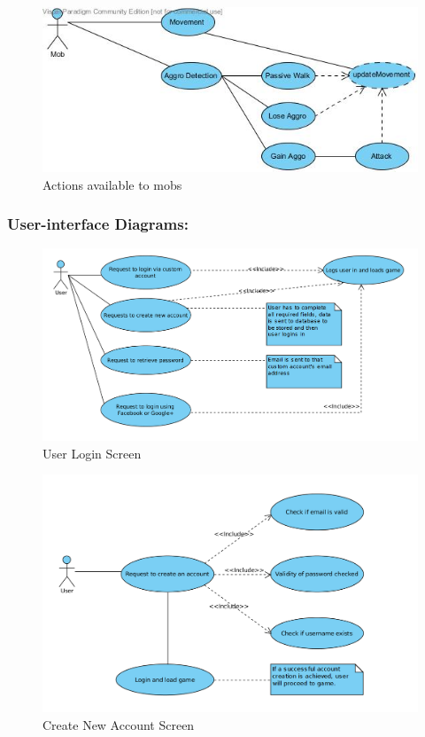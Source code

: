 \documentclass[letterpaper]{article}
\begin{document}
					\begin{figure}[H]
					\centering
					\includegraphics[width=140mm]{UML_Diagram/Use_Case/Mob_Actions.jpg}
					\caption{Actions available to mobs}
					\end{figure}
					
				\vspace{0.2in}
				\subsubsection*{User-interface Diagrams:}
				\vspace{0.2in}
				
					\begin{figure}[H]
					\centering
					\includegraphics[width=140mm]{UML_Diagram/Use_Case/User_Login.jpg}
					\caption{User Login Screen}
					\end{figure}
				
					\begin{figure}[H]
					\centering
					\includegraphics[width=140mm]{UML_Diagram/Use_Case/CreatAccount_UseCase.jpg}
					\caption{Create New Account Screen}
					\end{figure}
				
\end{document}
